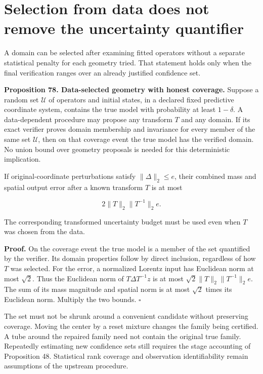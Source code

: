 \section{Selection from data does not remove the uncertainty quantifier}\label{LSM:selection-from-data-does-not-remove-the-uncertainty-quantifier}

A domain can be selected after examining fitted operators without a
separate statistical penalty for each geometry tried. That statement
holds only when the final verification ranges over an already justified
confidence set.

\textbf{Proposition 78. Data-selected geometry with honest coverage.}
Suppose a random set \(\mathcal U\) of operators and initial states, in
a declared fixed predictive coordinate system, contains the true model
with probability at least \(1-\delta\). A data-dependent procedure may
propose any transform \(T\) and any domain. If its exact verifier proves
domain membership and invariance for every member of the same set
\(\mathcal U\), then on that coverage event the true model has the
verified domain. No union bound over geometry proposals is needed for
this deterministic implication.

If original-coordinate perturbations satisfy \(\|\Delta\|_2\leq e\),
their combined mass and spatial output error after a known transform
\(T\) is at most

\[
\boxed{2\|T\|_2\|T^{-1}\|_2 e.}
\]

The corresponding transformed uncertainty budget must be used even when
\(T\) was chosen from the data.

\textbf{Proof.} On the coverage event the true model is a member of the
set quantified by the verifier. Its domain properties follow by direct
inclusion, regardless of how \(T\) was selected. For the error, a
normalized Lorentz input has Euclidean norm at most \(\sqrt2\). Thus the
Euclidean norm of \(T\Delta T^{-1}z\) is at most
\(\sqrt2\|T\|_2\|T^{-1}\|_2e\). The sum of its mass magnitude and
spatial norm is at most \(\sqrt2\) times its Euclidean norm. Multiply
the two bounds. \(\square\)

The set must not be shrunk around a convenient candidate without
preserving coverage. Moving the center by a reset mixture changes the
family being certified. A tube around the repaired family need not
contain the original true family. Repeatedly estimating new confidence
sets still requires the stage accounting of Proposition 48. Statistical
rank coverage and observation identifiability remain assumptions of the
upstream procedure.

